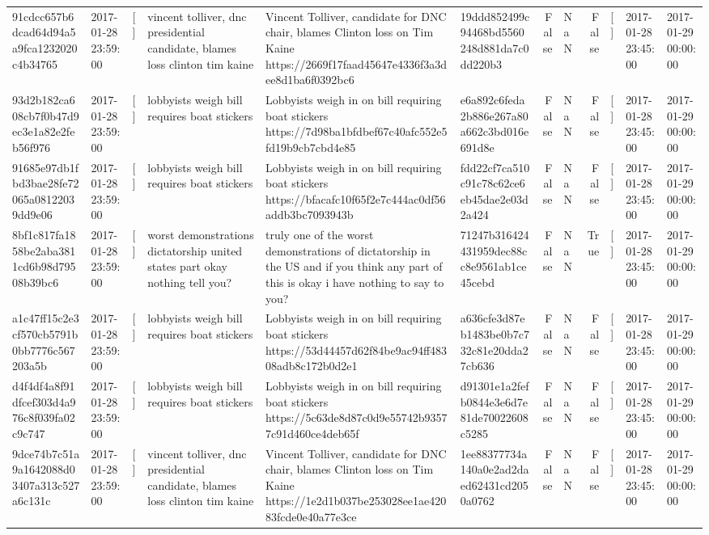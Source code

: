 \begin{tabular}{llllllrlrlll}
91cdcc657b6dcad64d94a5a9fca1232020c4b34765 & 2017-01-28 23:59:00 & [] & vincent tolliver, dnc presidential candidate, blames loss clinton tim kaine & Vincent Tolliver, candidate for DNC chair, blames Clinton loss on Tim Kaine https://2669f17faad45647e4336f3a3dee8d1ba6f0392bc6 & 19ddd852499c94468bd5560248d881da7c0dd220b3 & False & NaN & False & [] & 2017-01-28 23:45:00 & 2017-01-29 00:00:00 \\
93d2b182ca608cb7f0b47d9ec3e1a82e2feb56f976 & 2017-01-28 23:59:00 & [] & lobbyists weigh bill requires boat stickers & Lobbyists weigh in on bill requiring boat stickers https://7d98ba1bfdbef67c40afc552e5fd19b9cb7cbd4e85 & e6a892c6feda2b886e267a80a662c3bd016e691d8e & False & NaN & False & [] & 2017-01-28 23:45:00 & 2017-01-29 00:00:00 \\
91685e97db1fbd3bae28fe72065a08122039dd9e06 & 2017-01-28 23:59:00 & [] & lobbyists weigh bill requires boat stickers & Lobbyists weigh in on bill requiring boat stickers https://bfacafc10f65f2e7c444ac0df56addb3bc7093943b & fdd22cf7ca510c91c78c62ce6eb45dae2e03d2a424 & False & NaN & False & [] & 2017-01-28 23:45:00 & 2017-01-29 00:00:00 \\
8bf1c817fa1858be2aba3811cd6b98d79508b39bc6 & 2017-01-28 23:59:00 & [] & worst demonstrations dictatorship united states part okay nothing tell you? & truly one of the worst demonstrations of dictatorship in the US and if you think any part of this is okay i have nothing to say to you? & 71247b316424431959dec88cc8e9561ab1ce45cebd & False & NaN & True & [] & 2017-01-28 23:45:00 & 2017-01-29 00:00:00 \\
a1c47ff15c2e3cf570cb5791b0bb7776c567203a5b & 2017-01-28 23:59:00 & [] & lobbyists weigh bill requires boat stickers & Lobbyists weigh in on bill requiring boat stickers https://53d44457d62f84be9ac94ff48308adb8c172b0d2e1 & a636cfe3d87eb1483be0b7c732c81e20dda27cb636 & False & NaN & False & [] & 2017-01-28 23:45:00 & 2017-01-29 00:00:00 \\
d4f4df4a8f91dfcef303d4a976c8f039fa02c9c747 & 2017-01-28 23:59:00 & [] & lobbyists weigh bill requires boat stickers & Lobbyists weigh in on bill requiring boat stickers https://5c63de8d87c0d9e55742b93577c91d460ce4deb65f & d91301e1a2fefb0844e3e6d7e81de70022608c5285 & False & NaN & False & [] & 2017-01-28 23:45:00 & 2017-01-29 00:00:00 \\
9dce74b7c51a9a1642088d03407a313c527a6c131c & 2017-01-28 23:59:00 & [] & vincent tolliver, dnc presidential candidate, blames loss clinton tim kaine & Vincent Tolliver, candidate for DNC chair, blames Clinton loss on Tim Kaine https://1e2d1b037be253028ee1ae42083fcde0e40a77e3ce & 1ee88377734a140a0e2ad2daed62431cd2050a0762 & False & NaN & False & [] & 2017-01-28 23:45:00 & 2017-01-29 00:00:00 \\

\end{tabular}

